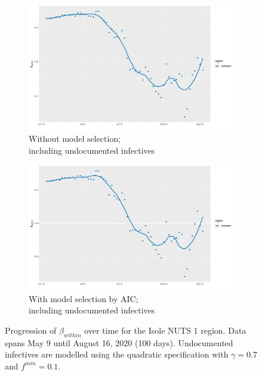 \documentclass[12pt]{article}
\begin{document}
\begin{appendices}
\begin{figure}[H]
\begin{subfigure}{\textwidth}
    	      \includegraphics[width=0.92\linewidth]{output/model_within_lag14_betawithin_Isole_UndocQuadratic_rolling.pdf}
    	      \caption{Without model selection; \\ including undocumented infectives}
    	      \label{fig:beta_within_over_time_isole_regular_undoc}
    	    \end{subfigure}\newline
    	    \begin{subfigure}{\textwidth}
    	      \centering
    	      \includegraphics[width=0.92\linewidth]{output/model_within_lag14_betawithin_Isole_aic_UndocQuadratic_rolling.pdf}
    	      \caption{With model selection by AIC; \\ including undocumented infectives}
    	      \label{fig:beta_within_over_time_isole_aic_undoc}
    	    \end{subfigure}
    	    \caption{Progression of $\beta_{within}$ over time for the Isole NUTS 1 region. Data spans May 9 until August 16, 2020 (100 days). Undocumented infectives are modelled using the quadratic specification with $\gamma = 0.7$ and $f^{min}=0.1$.}
    	    \label{fig:beta_within_over_time_isole}
	    \end{figure}
		

\end{appendices}
\end{document}
